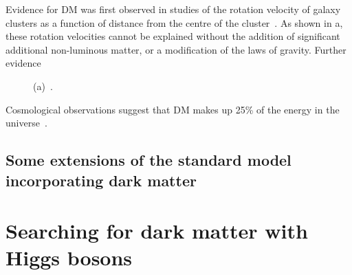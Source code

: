 Evidence for \ac{DM} was first observed in studies of the rotation velocity of galaxy clusters as a function of distance from the centre of the cluster~\cite{Zwicky:1933gu}. As shown in a, these rotation velocities cannot be explained without the addition of significant additional non-luminous matter, or a modification of the laws of gravity. Further evidence

\begin{figure}

  \caption{(a)~\cite{Freese:2008cz}. }%
  \label{fig:dmevidence}
\end{figure}

Cosmological observations suggest that \ac{DM} makes up 25\% of the energy in the universe~\cite{refId0}.


\subsection{Some extensions of the standard model incorporating dark matter}
\label{sec:DMextensions}

\section{Searching for dark matter with Higgs bosons}
\label{sec:higgsdm}


